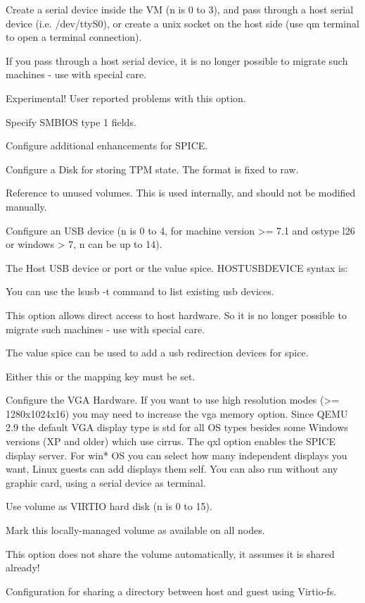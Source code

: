 Create a serial device inside the VM (n is 0 to 3), and pass through a host serial device (i.e. /dev/ttyS0), or create a unix socket on the host side (use qm terminal to open a terminal connection).

If you pass through a host serial device, it is no longer possible to migrate such machines - use with special care.

Experimental! User reported problems with this option.

Specify SMBIOS type 1 fields.

Configure additional enhancements for SPICE.

Configure a Disk for storing TPM state. The format is fixed to raw.

Reference to unused volumes. This is used internally, and should not be modified manually.

Configure an USB device (n is 0 to 4, for machine version >= 7.1 and ostype l26 or windows > 7, n can be up to 14).

The Host USB device or port or the value spice. HOSTUSBDEVICE syntax is:

You can use the lsusb -t command to list existing usb devices.

This option allows direct access to host hardware. So it is no longer possible to migrate such machines - use with special care.

The value spice can be used to add a usb redirection devices for spice.

Either this or the mapping key must be set.

Configure the VGA Hardware. If you want to use high resolution modes (>= 1280x1024x16) you may need to increase the vga memory option. Since QEMU 2.9 the default VGA display type is std for all OS types besides some Windows versions (XP and older) which use cirrus. The qxl option enables the SPICE display server. For win* OS you can select how many independent displays you want, Linux guests can add displays them self. You can also run without any graphic card, using a serial device as terminal.

Use volume as VIRTIO hard disk (n is 0 to 15).

Mark this locally-managed volume as available on all nodes.

This option does not share the volume automatically, it assumes it is shared already!

Configuration for sharing a directory between host and guest using Virtio-fs.

